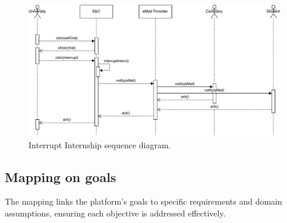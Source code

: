 \begin{figure}[H]
    \begin{center}
        \includegraphics[width=\linewidth]{Images/SequenceDiagram/InterruptInternSD.pdf}
        \caption{Interrupt Internship sequence diagram.}
        \label{fig:interrupt_intern_seqdiag}%
    \end{center}
\end{figure}



\subsection{Mapping on goals}
\label{subsec:mapping_on_goals}%

The mapping links the platform's goals to specific
requirements and domain assumptions, ensuring each objective is
addressed effectively.

